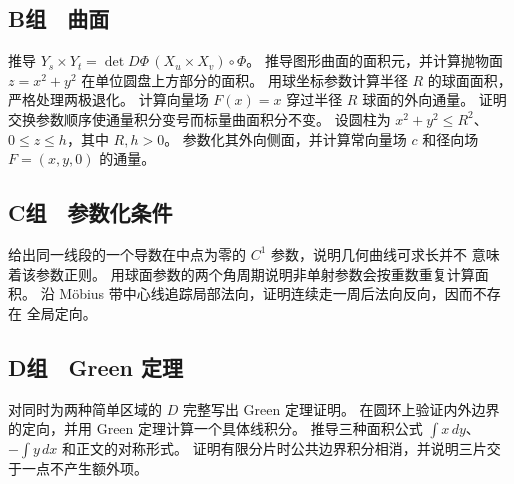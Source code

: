 \subsection*{B组　曲面}
\begin{enumerate}[label=\textbf{\thechapter.\arabic*.},resume]
 推导 $Y_s\times Y_t=\det D\Phi\,(X_u\times X_v)\circ\Phi$。
 推导图形曲面的面积元，并计算抛物面 $z=x^2+y^2$ 在单位圆盘上方部分的面积。
 用球坐标参数计算半径 $R$ 的球面面积，严格处理两极退化。
 计算向量场 $F(x)=x$ 穿过半径 $R$ 球面的外向通量。
 证明交换参数顺序使通量积分变号而标量曲面积分不变。
 设圆柱为 $x^2+y^2\le R^2$、$0\le z\le h$，其中 $R,h>0$。
 参数化其外向侧面，并计算常向量场 $c$ 和径向场 $F=(x,y,0)$ 的通量。
\end{enumerate}
\subsection*{C组　参数化条件}
\begin{enumerate}[label=\textbf{\thechapter.\arabic*.},resume]
 给出同一线段的一个导数在中点为零的 $C^1$ 参数，说明几何曲线可求长并不
 意味着该参数正则。
 用球面参数的两个角周期说明非单射参数会按重数重复计算面积。
 沿 Möbius 带中心线追踪局部法向，证明连续走一周后法向反向，因而不存在
 全局定向。
\end{enumerate}

\subsection*{D组　Green 定理}
\begin{enumerate}[label=\textbf{\thechapter.\arabic*.},resume]
 对同时为两种简单区域的 \(D\) 完整写出 Green 定理证明。
 在圆环上验证内外边界的定向，并用 Green 定理计算一个具体线积分。
 推导三种面积公式 \(\int x\,dy\)、\(-\int y\,dx\) 和正文的对称形式。
 证明有限分片时公共边界积分相消，并说明三片交于一点不产生额外项。
\end{enumerate}

